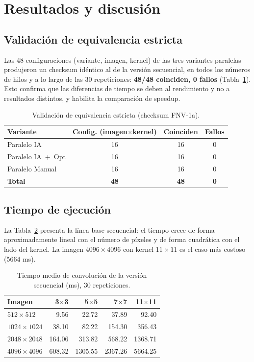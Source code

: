 \documentclass[12pt]{article}
\begin{document}
\section{Resultados y discusión}
\label{sec:resultados}

\subsection{Validación de equivalencia estricta}
Las 48 configuraciones (variante, imagen, kernel) de las tres variantes paralelas
produjeron un checksum idéntico al de la versión secuencial, en todos los números
de hilos y a lo largo de las 30 repeticiones: \textbf{48/48 coinciden, 0 fallos}
(Tabla~\ref{tab:validacion}). Esto confirma que las diferencias de tiempo se deben
al rendimiento y no a resultados distintos, y habilita la comparación de speedup.

\begin{table}[H]
\centering
\caption{Validación de equivalencia estricta (checksum FNV-1a).}
\label{tab:validacion}
\small
\begin{tabular}{@{}lccc@{}}
\toprule
\textbf{Variante} & \textbf{Config. (imagen$\times$kernel)} & \textbf{Coinciden} & \textbf{Fallos} \\
\midrule
Paralelo IA        & 16 & 16 & 0 \\
Paralelo IA~+~Opt  & 16 & 16 & 0 \\
Paralelo Manual    & 16 & 16 & 0 \\
\midrule
\textbf{Total}     & \textbf{48} & \textbf{48} & \textbf{0} \\
\bottomrule
\end{tabular}
\end{table}

\subsection{Tiempo de ejecución}
La Tabla~\ref{tab:secuencial} presenta la línea base secuencial: el tiempo crece
de forma aproximadamente lineal con el número de píxeles y de forma cuadrática con
el lado del kernel. La imagen $4096\times4096$ con kernel $11\times11$ es el caso
más costoso (5664 ms).

\begin{table}[H]
\centering
\caption{Tiempo medio de convolución de la versión secuencial (ms), 30 repeticiones.}
\label{tab:secuencial}
\small
\begin{tabular}{@{}lrrrr@{}}
\toprule
\textbf{Imagen} & \textbf{3$\times$3} & \textbf{5$\times$5} & \textbf{7$\times$7} & \textbf{11$\times$11} \\
\midrule
$512\times512$     &    9.56 &   22.72 &   37.89 &    92.40 \\
$1024\times1024$   &   38.10 &   82.22 &  154.30 &   356.43 \\
$2048\times2048$   &  164.06 &  313.82 &  568.22 &  1368.71 \\
$4096\times4096$   &  608.32 & 1305.55 & 2367.26 &  5664.25 \\
\bottomrule
\end{tabular}
\end{table}
\end{document}
